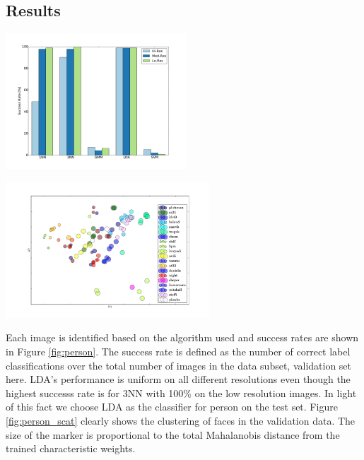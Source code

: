 \documentclass{article} %
\begin{document}
\subsection{Results}

\begin{minipage}{0.45\linewidth}
	\centering
	\includegraphics[height=2in]{fig/person.pdf}
	\label{fig:person}
\end{minipage}
\hfill
\begin{minipage}{0.45\linewidth}
	\centering
	\includegraphics[height=2in]{fig/person_scatter.pdf}
	\label{fig:person_scat}
\end{minipage}

Each image is identified based on the algorithm used and success rates are shown in Figure \ref{fig:person}.  The success rate is defined as the number of correct label classifications over the total number of images in the data subset, validation set here.  LDA's performance is uniform on all different resolutions even though the highest successs rate is for 3NN with 100\% on the low resolution images.  In light of this fact we choose LDA as the classifier for person on the test set.  Figure \ref{fig:person_scat} clearly shows the clustering of faces in the validation data. The size of the marker is proportional to the total Mahalanobis distance from the trained characteristic weights.
\end{document}
